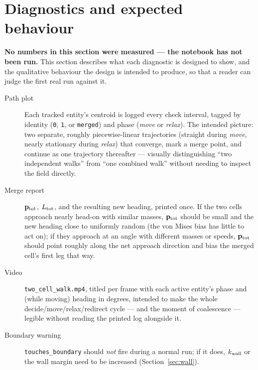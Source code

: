 \documentclass[11pt]{article}
\newcommand{\bp}{\mathbf{p}}
\begin{document}
\section{Diagnostics and expected behaviour}
\label{sec:results}

\textbf{No numbers in this section were measured — the notebook has
not been run.} This section describes what each diagnostic is
designed to show, and the qualitative behaviour the design is
intended to produce, so that a reader can judge the first real run
against it.

\begin{description}
\item[Path plot] Each tracked entity's centroid is logged every check
interval, tagged by identity (\texttt{0}, \texttt{1}, or
\texttt{merged}) and phase (\emph{move} or \emph{relax}). The intended
picture: two separate, roughly piecewise-linear trajectories (straight
during \emph{move}, nearly stationary during \emph{relax}) that
converge, mark a merge point, and continue as one trajectory
thereafter — visually distinguishing ``two independent walks'' from
``one combined walk'' without needing to inspect the field directly.
\item[Merge report] $\bp_{\rm tot}$, $L_{\rm tot}$, and the resulting
new heading, printed once. If the two cells approach nearly head-on
with similar masses, $\bp_{\rm tot}$ should be small and the new
heading close to uniformly random (the von Mises bias has little to
act on); if they approach at an angle with different masses or speeds,
$\bp_{\rm tot}$ should point roughly along the net approach direction
and bias the merged cell's first leg that way.
\item[Video] \texttt{two\_cell\_walk.mp4}, titled per frame with each
active entity's phase and (while moving) heading in degrees, intended
to make the whole decide/move/relax/redirect cycle — and the moment of
coalescence — legible without reading the printed log alongside it.
\item[Boundary warning] \texttt{touches\_boundary} should \emph{not}
fire during a normal run; if it does, $k_{\rm wall}$ or the wall
margin need to be increased (Section~\ref{sec:wall}).
\end{description}
\end{document}
